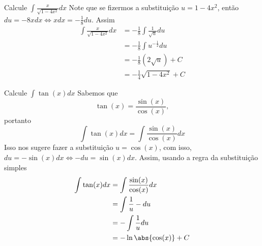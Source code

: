 \begin{example}
  Calcule \(\int \frac{x}{\sqrt{1-4x^2}}dx\)
  \solution
  Note que se fizermos a substituição $u=1-4x^2$, então
  $du=-8x dx \Leftrightarrow xdx = -\frac{1}{8} du$.
  Assim
  \begin{align*}
    \int \frac{x}{\sqrt{1-4x^2}}dx
    & = -\frac{1}{8} \int \frac{1}{\sqrt{u}}du \\
    & = -\frac{1}{8} \int u^{-\frac{1}{2}} du \\
    & = -\frac{1}{8}(2 \sqrt{u})+C \\
    & = -\frac{1}{4}\sqrt{1-4x^2}+C
  \end{align*}
\end{example}

\begin{example}
  Calcule \(\int \tan(x) dx\)
  \solution
  Sabemos que
  \[
    \tan(x)=\frac{\sin(x)}{\cos(x)},
  \]
  portanto
  \[
    \int \tan(x) dx= \int \frac{\sin(x)}{\cos(x)} dx
  \]
  Isso nos sugere fazer a substituição $u=\cos(x)$, com isso,
  $du=-\sin(x)dx \Leftrightarrow -du= \sin(x)dx$.
  Assim, usando a regra da substituição simples
  \begin{align*}
    \int \tan(x) dx
    & = \int \frac{\sin(x)}{\cos(x)} dx \\
    & = \int \frac{1}{u} -du \\
    & = - \int \frac{1}{u} du \\
    & = - \ln \abs{\cos(x)}+C
  \end{align*}
\end{example}

